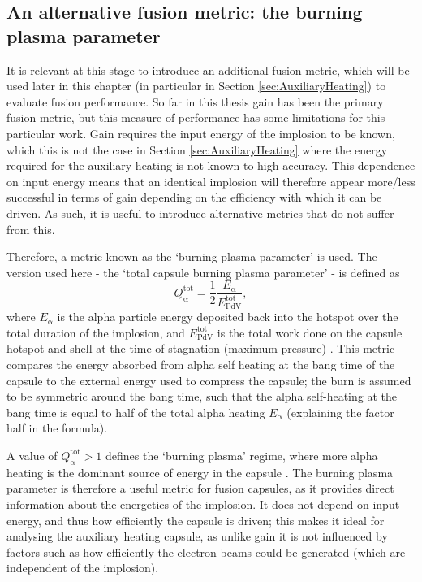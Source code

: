 \subsection{An alternative fusion metric: the burning plasma parameter}
It is relevant at this stage to introduce an additional fusion metric, which will be used later in this chapter (in particular in Section \ref{sec:AuxiliaryHeating}) to evaluate fusion performance. So far in this thesis gain has been the primary fusion metric, but this measure of performance has some limitations for this particular work. Gain requires the input energy of the implosion to be known, which this is not the case in Section \ref{sec:AuxiliaryHeating} where the energy required for the auxiliary heating is not known to high accuracy. This dependence on input energy means that an identical implosion will therefore appear more/less successful in terms of gain depending on the efficiency with which it can be driven. As such, it is useful to introduce alternative metrics that do not suffer from this.

Therefore, a metric known as the `burning plasma parameter' is used. The version used here - the `total capsule burning plasma parameter' - is defined as 
\begin{equation} Q^\mathrm{{tot}}_{\mathrm{\alpha}} = \frac{1}{2} \frac{E_\mathrm{\alpha}}{ E^\mathrm{{tot}}_{\mathrm{PdV}}}, \label{eqn:Qtot defn} \end{equation} where $E_\mathrm{\alpha}$ is the alpha particle energy deposited back into the hotspot over the total duration of the implosion, and $E^\mathrm{{tot}}_{\mathrm{PdV}}$ is the total work done on the capsule hotspot and shell at the time of stagnation (maximum pressure) \cite{Betti2015}. This metric compares the energy absorbed from alpha self heating at the bang time of the capsule to the external energy used to compress the capsule; the burn is assumed to be symmetric around the bang time, such that the alpha self-heating at the bang time is equal to half of the total alpha heating $E_\mathrm{\alpha}$ (explaining the factor half in the formula). 

A value of $Q^\mathrm{{tot}}_{\mathrm{\alpha}} > 1$ defines the `burning plasma' regime, where more alpha heating is the dominant source of energy in the capsule \cite{Christopherson2020}. The burning plasma parameter is therefore a useful metric for fusion capsules, as it provides direct information about the energetics of the implosion. It does not depend on input energy, and thus how efficiently the capsule is driven; this makes it ideal for analysing the auxiliary heating capsule, as unlike gain it is not influenced by factors such as how efficiently the electron beams could be generated (which are independent of the implosion).

